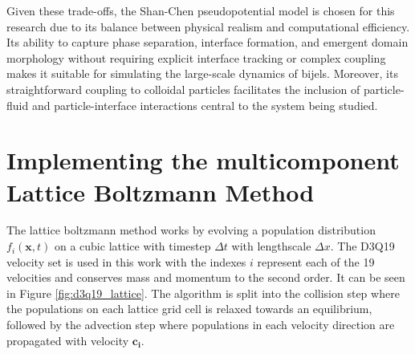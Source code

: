 Given these trade-offs, the Shan-Chen pseudopotential model is chosen for this research due to its balance between physical realism and computational 
efficiency. \cite{jansen_bijels_2011,gunther_timescales_2014, gunther_lattice_2013, xie_direct_2017}
Its ability to capture phase separation, interface formation, and emergent domain morphology without requiring explicit interface 
tracking or complex coupling makes it suitable for simulating the large-scale dynamics of bijels. Moreover, its straightforward coupling to 
colloidal particles facilitates the inclusion of particle-fluid and particle-interface interactions central to the system being studied.

\section{Implementing the multicomponent Lattice Boltzmann Method} 
\label{section:lbm_hydrodynamics}

The lattice boltzmann method works by evolving a population distribution $f_{i}(\mathbf{x}, t)$ on a cubic lattice with 
timestep $\Delta t$ with lengthscale $\Delta x$. \cite{qian_lattice_1992, succi_lattice_2018, he_theory_1997} The D3Q19 
velocity set is used in this work with the indexes $i$ represent each of the 19 velocities and conserves mass and momentum 
to the second order. It can be seen in Figure \ref{fig:d3q19_lattice}. The algorithm is split into the 
collision step where the populations on each lattice grid cell is relaxed towards an equilibrium, followed by the 
advection step where populations in each velocity direction are propagated with velocity $\mathbf{c_i}$. 



